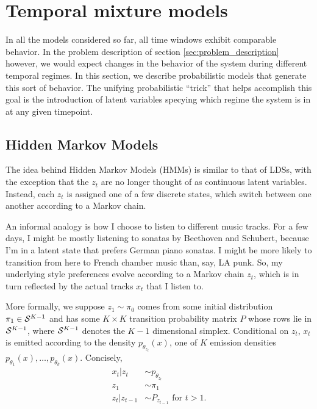 \documentclass[14pt]{extreport}
\begin{document}
\section{Temporal mixture models}
\label{sec:temporal_mixture_models}

In all the models considered so far, all time windows exhibit comparable
behavior. In the problem description of section \ref{sec:problem_description}
however, we would expect changes in the behavior of the system during different
temporal regimes. In this section, we describe probabilistic models that
generate this sort of behavior. The unifying probabilistic ``trick'' that helps
accomplish this goal is the introduction of latent variables specying which
regime the system is in at any given timepoint.

\subsection{Hidden Markov Models}
\label{subsec:hmms}

The idea behind Hidden Markov Models (HMMs) is similar to that of LDSs, with the
exception that the $z_{t}$ are no longer thought of as continuous latent
variables. Instead, each $z_{t}$ is assigned one of a few discrete states,
which switch between one another according to a Markov chain.

An informal analogy is how I choose to listen to different music tracks. For a
few days, I might be mostly listening to sonatas by Beethoven and Schubert,
because I'm in a latent state that prefers German piano sonatas. I might be more
likely to transition from here to French chamber music than, say, LA punk. So,
my underlying style preferences evolve according to a Markov chain $z_{t}$,
which is in turn reflected by the actual tracks $x_{t}$ that I listen to.

More formally, we suppose $z_{1} \sim \pi_{0}$ comes from some initial
distribution $\pi_{1} \in \mathcal{S}^{K - 1}$ and has some $K \times K$ transition
probability matrix $P$ whose rows lie in $\mathcal{S}^{K - 1}$, where $\mathcal{S}^{K
  - 1}$ denotes the $K - 1$ dimensional simplex. Conditional on $z_{t}$, $x_{t}$
is emitted according to the density $p_{\theta_{z_{t}}}\left(x\right)$, one of
$K$ emission densities $p_{\theta_{1}}\left(x\right), \dots,
p_{\theta_{k}}\left(x\right)$. Concisely,
\begin{align*}
  x_{t} \vert z_{t} &\sim p_{\theta_{z_{t}}} \\
  z_{1} &\sim \pi_{1} \\
  z_{t} \vert z_{t - 1} &\sim P_{z_{t - 1}} \text{ for } t > 1.
\end{align*}
\end{document}
